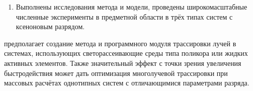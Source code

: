 \begin{enumerate}

	\item Выполнены исследования метода и модели, проведены широкомасштабные численные эксперименты в предметной области в трёх типах систем с ксеноновым разрядом.
\end{enumerate}

 предполагает создание метода и программного модуля трассировки лучей в системах, использующих светорассеивающие среды типа поликора или жидких активных элементов.
Также значительный эффект с точки зрения увеличения быстродействия может дать оптимизация многолучевой трассировки при массовых расчётах однотипных систем с отличающимися параметрами разряда.
